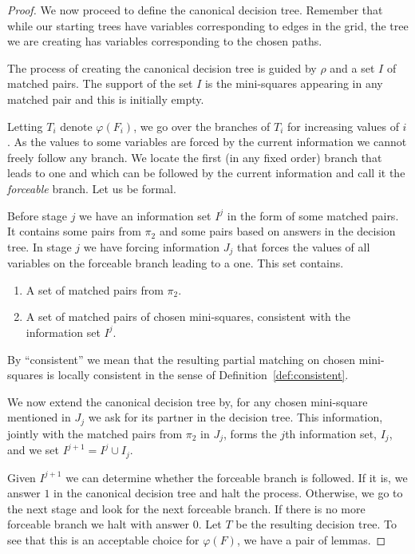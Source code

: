 \documentclass{theoretics}
\begin{document}
\begin{proof}
We now proceed to define the
canonical decision tree.  Remember that while our starting trees
have variables corresponding to edges in the grid, the tree we 
are creating has variables corresponding to the chosen paths.

The process of creating the canonical decision tree
is guided by $\rho$
and a set $I$ of matched pairs.  The support of the set
$I$ is the mini-squares appearing in any matched
pair and this is initially empty.

Letting $T_i$ denote $\varphi(F_i)$,
we go over the branches of $T_i$ for increasing
values of $i$.  As the values to some variables
are forced by the current information we cannot freely
follow any branch.  We locate the first (in any fixed order)
branch that leads to one and which can be followed
by the current information and call it the {\em forceable} branch.
Let us be formal.

Before stage $j$ we have an information set $I^{j}$ in the form of
some matched pairs.  It contains
some pairs from $\pi_2$ and some pairs based on answers in the decision
tree.  In stage $j$ we have forcing information $J_j$ that forces
the values of all variables on the forceable branch leading
to a one.  This set contains.

\begin{enumerate}

\item A set of matched pairs from $\pi_2$.

\item A set of matched pairs of chosen mini-squares, consistent
with the information set $I^j$.

\end{enumerate}
By ``consistent'' we mean that the resulting partial
matching on chosen mini-squares is locally consistent in the 
sense of Definition~\ref{def:consistent}.

We now extend the canonical decision tree
by, for any chosen mini-square mentioned in $J_j$ we ask
for its partner in the decision tree.  This
information, jointly with the matched pairs from $\pi_2$
in $J_j$, forms the $j$th information set, $I_{j}$, and
we set $I^{j+1}= I^j \cup I_j$.

Given $I^{j+1}$ we can determine whether the forceable
branch is followed.  If it is, we answer $1$ in the canonical
decision tree and halt the process.  Otherwise, we go to the next stage
and look for the next forceable branch.  If there is no more forceable
branch we halt with answer $0$.  Let $T$ be the resulting decision
tree.  To see that this is an acceptable choice for $\varphi (F)$,
we have a pair of lemmas.


\end{proof}
\end{document}

